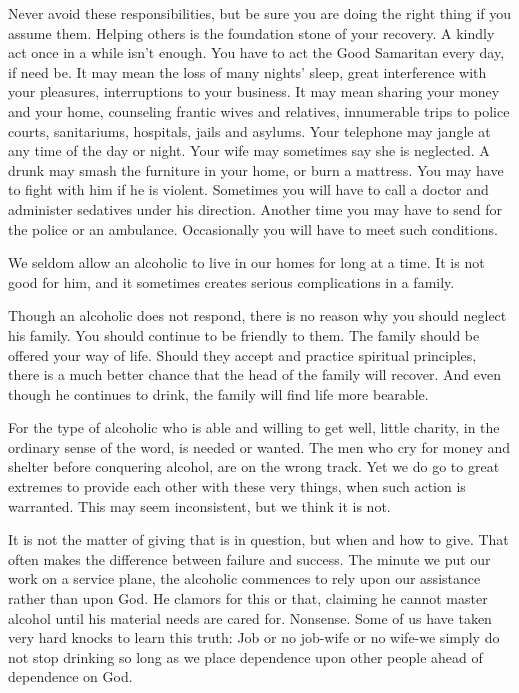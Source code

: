 \begin{biblechapter}
Never avoid these responsibilities, but be sure you are doing the right thing if you assume them.  Helping others is the foundation stone of your recovery.  A kindly act once in a while isn't enough.  You have to act the Good Samaritan every day, if need be.  It may mean the loss of many nights' sleep, great interference with your pleasures, interruptions to your business.  It may mean sharing your money and your home, counseling frantic wives and relatives, innumerable trips to police courts, sanitariums, hospitals, jails and asylums.  Your telephone may jangle at any time of the day or night.  Your wife may sometimes say she is neglected.  A drunk may smash the furniture in your home, or burn a mattress.  You may have to fight with him if he is violent.  Sometimes you will have to call a doctor and administer sedatives under his direction.  Another time you may have to send for the police or an ambulance.  Occasionally you will have to meet such conditions.

We seldom allow an alcoholic to live in our homes for long at a time.  It is not good for him, and it sometimes creates serious complications in a family.

Though an alcoholic does not respond, there is no reason why you should neglect his family.  You should continue to be friendly to them.  The family should be offered your way of life.  Should they accept and practice spiritual principles, there is a much better chance that the head of the family will recover.  And even though he continues to drink, the family will find life more bearable.

For the type of alcoholic who is able and willing to get well, little charity, in the ordinary sense of the word, is needed or wanted.  The men who cry for money and shelter before conquering alcohol, are on the wrong track.  Yet we do go to great extremes to provide each other with these very things, when such action is warranted.  This may seem inconsistent, but we think it is not.

It is not the matter of giving that is in question, but when and how to give.  That often makes the difference between failure and success.  The minute we put our work on a service plane, the alcoholic commences to rely upon our assistance rather than upon God.  He clamors for this or that, claiming he cannot master alcohol until his material needs are cared for.  Nonsense.  Some of us have taken very hard knocks to learn this truth: Job or no job-wife or no wife-we simply do not stop drinking so long as we place dependence upon other people ahead of dependence on God.


\end{biblechapter}
